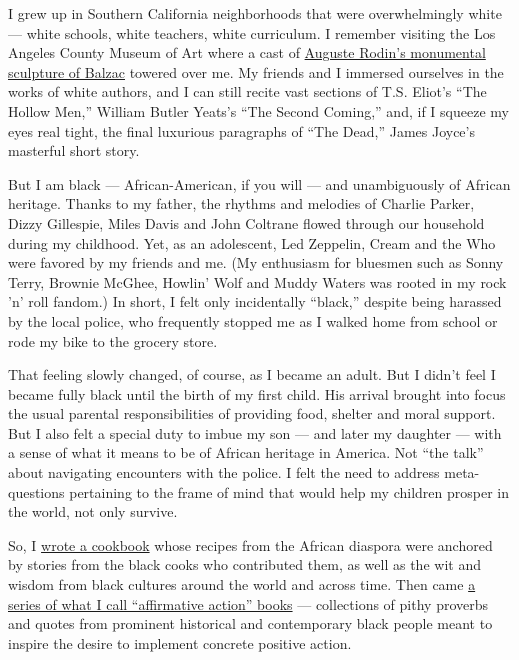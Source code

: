 I grew up in Southern California neighborhoods that were overwhelmingly
white --- white schools, white teachers, white curriculum. I remember
visiting the Los Angeles County Museum of Art where a cast of
\href{https://collections.lacma.org/node/251434}{Auguste Rodin's
monumental sculpture of Balzac} towered over me. My friends and I
immersed ourselves in the works of white authors, and I can still recite
vast sections of T.S. Eliot's ``The Hollow Men,'' William Butler Yeats's
``The Second Coming,'' and, if I squeeze my eyes real tight, the final
luxurious paragraphs of ``The Dead,'' James Joyce's masterful short
story.

But I am black --- African-American, if you will --- and unambiguously
of African heritage. Thanks to my father, the rhythms and melodies of
Charlie Parker, Dizzy Gillespie, Miles Davis and John Coltrane flowed
through our household during my childhood. Yet, as an adolescent, Led
Zeppelin, Cream and the Who were favored by my friends and me. (My
enthusiasm for bluesmen such as Sonny Terry, Brownie McGhee, Howlin'
Wolf and Muddy Waters was rooted in my rock 'n' roll fandom.) In short,
I felt only incidentally ``black,'' despite being harassed by the local
police, who frequently stopped me as I walked home from school or rode
my bike to the grocery store.

That feeling slowly changed, of course, as I became an adult. But I
didn't feel I became fully black until the birth of my first child. His
arrival brought into focus the usual parental responsibilities of
providing food, shelter and moral support. But I also felt a special
duty to imbue my son --- and later my daughter --- with a sense of what
it means to be of African heritage in America. Not ``the talk'' about
navigating encounters with the police. I felt the need to address
meta-questions pertaining to the frame of mind that would help my
children prosper in the world, not only survive.

So, I
\href{https://www.amazon.com/Fruits-Harvest-Recipes-Celebrate-Holidays-ebook/dp/B003YCOP98}{wrote
a cookbook} whose recipes from the African diaspora were anchored by
stories from the black cooks who contributed them, as well as the wit
and wisdom from black cultures around the world and across time. Then
came
\href{https://www.amazon.com/Black-Pearls-Affirmations-Inspirations-African-Americans/dp/0688122914}{a
series of what I call ``affirmative action'' books} --- collections of
pithy proverbs and quotes from prominent historical and contemporary
black people meant to inspire the desire to implement concrete positive
action.

